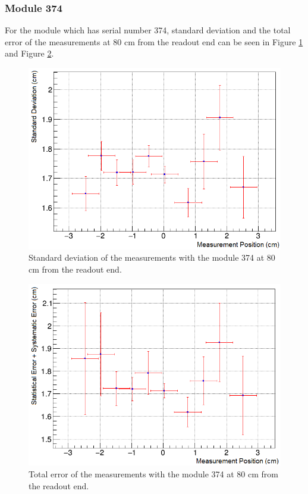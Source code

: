 \documentclass[a4paper]{article}\linespread{1.4}
\begin{document}
\subsubsection{Module 374} 
For the module which has serial number 374, standard deviation and the total error of the measurements at 80 cm from the readout end can be seen in Figure \ref{fig:74s} and Figure \ref{fig:74e}.
\begin{figure}[h!] \hspace*{-0cm} \includegraphics[width=120mm,scale=2.0]{74s.png} \caption{Standard deviation of the measurements with the module 374 at 80 cm from the readout end.}  \label{fig:74s}\end{figure}
\begin{figure}[h!] \hspace*{-0cm} \includegraphics[width=120mm,scale=2.0]{74e.png} \caption{Total error of the measurements with the module 374 at 80 cm from the readout end.}  \label{fig:74e}\end{figure}
\end{document}
